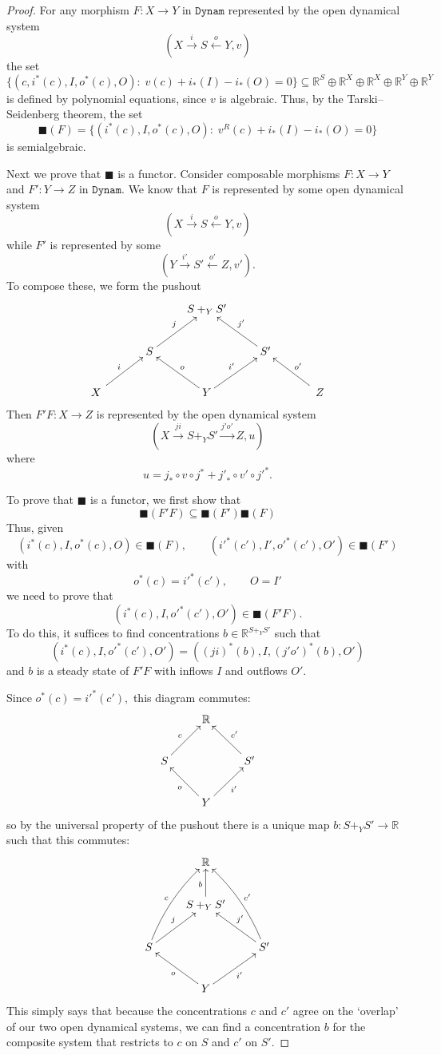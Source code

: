 \documentclass{compositionalityarticle}
\newcommand{\R}{\mathbb{R}}
\newcommand{\Dynam}{\mathtt{Dynam}}
\newcommand{\maps}{\colon}
\theoremstyle{plain}
\theoremstyle{remark}
\begin{document}
\begin{proof}
For any morphism $F \maps X \to Y$ in $\Dynam$ represented by the open dynamical system 
\[         (X \stackrel{i}\longrightarrow S \stackrel{o}\longleftarrow Y, v) \]
the set 
\[       \{(c, i^*(c),I,o^*(c),O) : \; v(c) + i_*(I) - i_*(O) = 0 \} \subseteq
\R^S \oplus \R^X \oplus \R^X \oplus \R^Y \oplus \R^Y \] 
is defined by polynomial equations, since $v$ is algebraic.   Thus, by the Tarski--Seidenberg theorem, the set 
\[    \blacksquare(F) = \{  (i^*(c),I,o^*(c),O) : \; v^R(c) + i_*(I) - i_*(O) = 0 \} \]
is semialgebraic.   

Next we prove that $\blacksquare$ is a functor.  Consider composable morphisms $F \maps X \to Y$ and $F' \maps Y \to Z$ in $\Dynam$.   We know that $F$ is represented by some open dynamical system 
\[         (X \stackrel{i}\longrightarrow S \stackrel{o}\longleftarrow Y, v) \]
while $F'$ is represented by some
\[         (Y \stackrel{i'}\longrightarrow S' \stackrel{o'}\longleftarrow Z, v') .\]
To compose these, we form the pushout
\[
    \xymatrix{
      && S +_Y S' \\
      & S \ar[ur]^{j} && S' \ar[ul]_{j'} \\
      \quad X\quad \ar[ur]^{i} && Y \ar[ul]_{o} \ar[ur]^{i'} &&\quad Z \quad \ar[ul]_{o'}
    }
\]
Then $F'F \maps X \to Z$ is represented by the open dynamical system
\[ (X \stackrel{j i}{\longrightarrow} S +_Y S' \stackrel{j' o'}{\longrightarrow} Z, u ) \]
where 
\[    u = j_* \circ v \circ j^* + {j'}_* \circ v' \circ {j'}^*  .\]

To prove that $\blacksquare$ is a functor, we first show that 
\[ \blacksquare(F'F) \subseteq \blacksquare(F') \blacksquare(F) \]  
Thus, given
\[     (i^*(c),I,o^*(c),O) \in \blacksquare(F), \qquad  ({i'}^*(c'),I',{o'}^*(c'),O') \in \blacksquare(F') \]
with 
\[   o^*(c) = {i'}^*(c'), \qquad O = I' \]
we need to prove that 
\[     (i^*(c),I,{o'}^*(c'),O') \in \blacksquare(F'F). \]
To do this, it suffices to find concentrations $b \in \R^{S +_Y S'}$ such that 
\[   (i^*(c),I,{o'}^*(c'),O') = ((ji)^*(b), I, {(j'o')}^*(b), O') \]
and $b$ is a steady state of $F'F$ with inflows $I$ and outflows $O'$.

Since  $o^*(c) = {i'}^*(c'),$ this diagram commutes:
\[
    \xymatrix{
      && \R \\
      & S \ar[ur]^{c} && S' \ar[ul]_{c'} \\
       && Y \ar[ul]^{o} \ar[ur]_{i'} &&
    }
\]
so by the universal property of the pushout there is a unique map $b \maps S +_Y S' \to \R$ such that
this commutes:
\begin{equation}
\label{eq:pushout}
    \xymatrix{
      && \R \\
     && S +_Y  S' \ar[u]^b \\      
      & S \ar@/^/[uur]^{c} \ar[ur]^{j} && S' \ar@/_/[uul]_{c'} \ar[ul]_{j'} \\
       && Y \ar[ul]^{o} \ar[ur]_{i'} &&
    }
\end{equation}
This simply says that because the concentrations $c$ and $c'$ agree on the `overlap' of our two
open dynamical systems, we can find a concentration $b$ for the composite system that restricts
to $c$ on $S$ and $c'$ on $S'$.


\end{proof}
\end{document}
